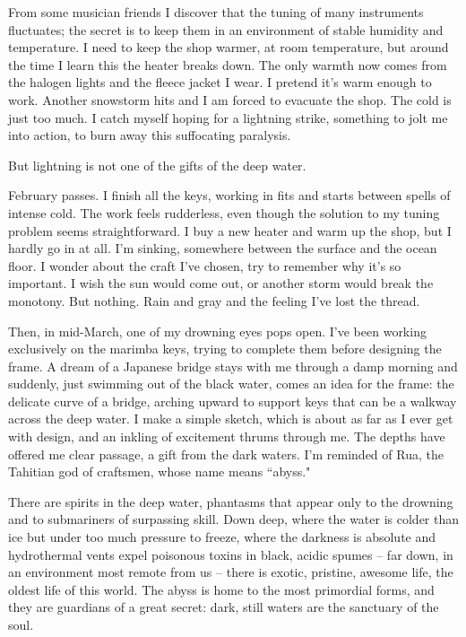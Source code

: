\documentclass[letterpaper,10pt,headsepline]{scrreprt}
\begin{document}
From some musician friends I discover that the tuning of many instruments fluctuates; the secret is to keep them in an environment of stable humidity and temperature. I need to keep the shop warmer, at room temperature, but around the time I learn this the heater breaks down. The only warmth now comes from the halogen lights and the fleece jacket I wear. I pretend it’s warm enough to work. Another snowstorm hits and I am forced to evacuate the shop. The cold is just too much. I catch myself hoping for a lightning strike, something to jolt me into action, to burn away this suffocating paralysis. 

But lightning is not one of the gifts of the deep water.

February passes. I finish all the keys, working in fits and starts between spells of intense cold. The work feels rudderless, even though the solution to my tuning problem seems straightforward. I buy a new heater and warm up the shop, but I hardly go in at all. I’m sinking, somewhere between the surface and the ocean floor. I wonder about the craft I’ve chosen, try to remember why it’s so important. I wish the sun would come out, or another storm would break the monotony. But nothing. Rain and gray and the feeling I’ve lost the thread.

Then, in mid-­March, one of my drowning eyes pops open. I’ve been working exclusively on the marimba keys, trying to complete them before designing the frame. A dream of a Japanese bridge stays with me through a damp morning and suddenly, just swimming out of the black water, comes an idea for the frame: the delicate curve of a bridge, arching upward to support keys that can be a walkway across the deep water. I make a simple sketch, which is about as far as I ever get with design, and an inkling of excitement thrums through me. The depths have offered me clear passage, a gift from the dark waters. I’m reminded of Rua, the Tahitian god of craftsmen, whose name means ``abyss."

There are spirits in the deep water, phantasms that appear only to the drowning and to submariners of surpassing skill. Down deep, where the water is colder than ice but under too much pressure to freeze, where the darkness is absolute and hydrothermal vents expel poisonous toxins in black, acidic spumes – far down, in an environment most remote from us – there is exotic, pristine, awesome life, the oldest life of this world. The abyss is home to the most primordial forms, and they are guardians of a great secret: dark, still waters are the sanctuary of the soul.
\end{document}
